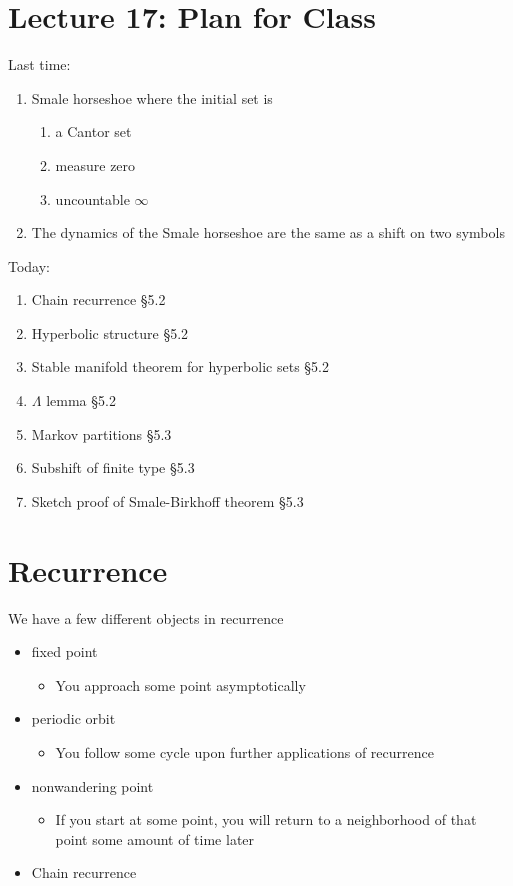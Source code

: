 \documentclass{article}
\begin{document}
\section{Lecture 17: Plan for Class}
Last time:
\begin{enumerate}
    \item Smale horseshoe where the initial set is 
    \begin{enumerate}
        \item a Cantor set
        \item measure zero 
        \item uncountable $\infty$ 
    \end{enumerate}
    \item The dynamics of the Smale horseshoe are the same as a shift on two symbols 
\end{enumerate}

Today:
\begin{enumerate}
    \item Chain recurrence \S 5.2
    \item Hyperbolic structure \S 5.2
    \item Stable manifold theorem for hyperbolic sets \S 5.2
    \item $\Lambda$ lemma \S 5.2
    \item Markov partitions \S 5.3
    \item Subshift of finite type \S 5.3
    \item Sketch proof of Smale-Birkhoff theorem \S 5.3
\end{enumerate}

\section{Recurrence}

We have a few different objects in recurrence
\begin{itemize}
    \item fixed point 
    \begin{itemize}
        \item You approach some point asymptotically 
    \end{itemize}
    \item periodic orbit 
    \begin{itemize}
        \item You follow some cycle upon further applications of recurrence
    \end{itemize}
    \item nonwandering point 
    \begin{itemize}
        \item If you start at some point, you will return to a neighborhood of that point some amount of time later 
    \end{itemize}
    \item Chain recurrence
\end{itemize}
\end{document}
